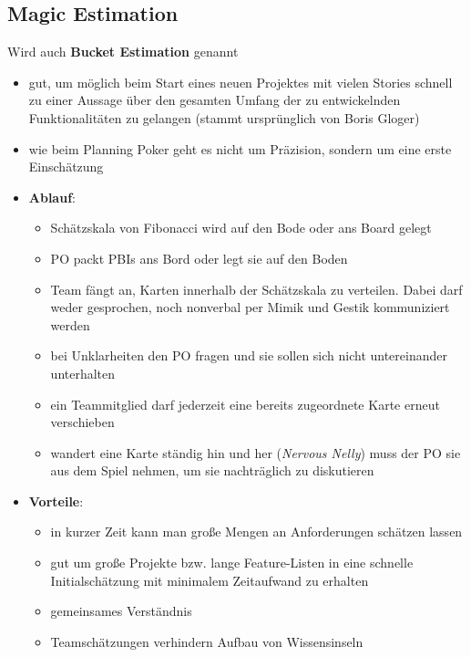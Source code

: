 \subsection{Magic Estimation}
Wird auch \textbf{Bucket Estimation} genannt
\begin{itemize}
  \item gut, um möglich beim Start eines neuen Projektes mit vielen Stories schnell zu einer Aussage über den
    gesamten Umfang der zu entwickelnden Funktionalitäten zu gelangen (stammt ursprünglich von
    Boris Gloger)
  \item wie beim Planning Poker geht es nicht um Präzision, sondern um eine erste Einschätzung
  \item \textbf{Ablauf}:
    \begin{itemize}
      \item Schätzskala von Fibonacci wird auf den Bode oder ans Board gelegt
      \item PO packt PBIs ans Bord oder legt sie auf den Boden
      \item Team fängt an, Karten innerhalb der Schätzskala zu verteilen. Dabei darf weder
        gesprochen, noch nonverbal per Mimik und Gestik kommuniziert werden
      \item bei Unklarheiten den PO fragen und sie sollen sich nicht untereinander
        unterhalten
      \item ein Teammitglied darf jederzeit eine bereits zugeordnete Karte erneut verschieben
      \item wandert eine Karte ständig hin und her (\textit{Nervous Nelly}) muss der PO sie
        aus dem Spiel nehmen, um sie nachträglich zu diskutieren
    \end{itemize}
  \item \textbf{Vorteile}:
    \begin{itemize}
      \item in kurzer Zeit kann man große Mengen an Anforderungen schätzen lassen
      \item gut um große Projekte bzw. lange Feature-Listen in eine schnelle
        Initialschätzung mit minimalem Zeitaufwand zu erhalten
      \item gemeinsames Verständnis
      \item Teamschätzungen verhindern Aufbau von Wissensinseln
    \end{itemize}
\end{itemize}


